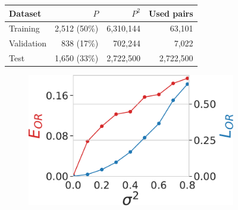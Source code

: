 \begin{figure}
    \begin{minipage}[b]{0.48\linewidth}
        \begin{minipage}{\linewidth}
            \begin{tabular}{lrrr}
                \toprule
                Dataset & $P$ & $P^2$ & Used pairs \\
                \midrule
                Training & 2,512 (50\%) & 6,310,144 & 63,101 \\ %
                Validation & 838 (17\%) & 702,244 & 7,022 \\ %
                Test & 1,650 (33\%) & 2,722,500 & 2,722,500 \\ %
                \bottomrule
            \end{tabular}
            \label{tab:dataset}
        \end{minipage}
        \begin{subfigure}[b]{0.49\linewidth}
            \includegraphics[width=\linewidth]{figures/5j0n_perfect_noisy_ar_aa}

\end{subfigure}
\end{minipage}
\end{figure}
